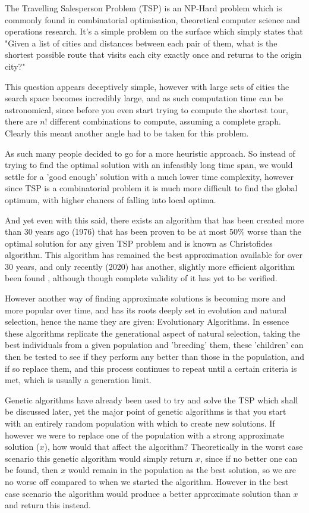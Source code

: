 \documentclass[11pt,a4paper,titlepage]{article}
\begin{document}
The Travelling Salesperson Problem (TSP) is an NP-Hard problem which is commonly found in combinatorial optimisation, theoretical computer science and operations research. It's a simple problem on the surface which simply states that "Given a list of cities and distances between each pair of them, what is the shortest possible route that visits each city exactly once and returns to the origin city?" \cite{TSPWiki}

This question appears deceptively simple, however with large sets of cities the search space becomes incredibly large, and as such computation time can be astronomical, since before you even start trying to compute the shortest tour, there are $n!$ different combinations to compute, assuming a complete graph. Clearly this meant another angle had to be taken for this problem.

As such many people decided to go for a more heuristic approach. So instead of trying to find the optimal solution with an infeasibly long time span, we would settle for a 'good enough' solution with a much lower time complexity, however since TSP is a combinatorial problem it is much more difficult to find the global optimum, with higher chances of falling into local optima.

And yet even with this said, there exists an algorithm that has been created more than 30 years ago (1976) that has been proven to be at most 50\% worse than the optimal solution for any given TSP problem and is known as Christofides algorithm. This algorithm has remained the best approximation available for over 30 years, and only recently (2020) has another, slightly more efficient algorithm been found \cite{TSP2020}, although though complete validity of it has yet to be verified.

However another way of finding approximate solutions is becoming more and more popular over time, and has its roots deeply set in evolution and natural selection, hence the name they are given: Evolutionary Algorithms. In essence these algorithms replicate the generational aspect of natural selection, taking the best individuals from a given population and 'breeding' them, these 'children' can then be tested to see if they perform any better than those in the population, and if so replace them, and this process continues to repeat until a certain criteria is met, which is usually a generation limit.

Genetic algorithms have already been used to try and solve the TSP which shall be discussed later, yet the major point of genetic algorithms is that you start with an entirely random population with which to create new solutions. If however we were to replace one of the population with a strong approximate solution ($x$), how would that affect the algorithm? Theoretically in the worst case scenario this genetic algorithm would simply return $x$, since if no better one can be found, then $x$ would remain in the population as the best solution, so we are no worse off compared to when we started the algorithm. However in the best case scenario the algorithm would produce a better approximate solution than $x$ and return this instead.
\end{document}
